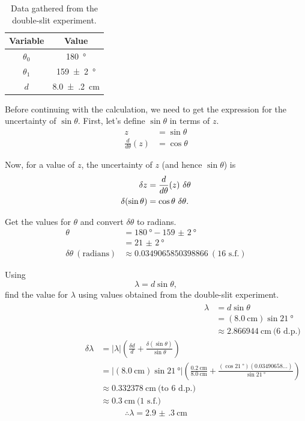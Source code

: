 \documentclass[letter,12pt]{article}
\newcommand{\tlambda}{\(\lambda\) }
\newcommand{\ttheta}{\(\theta\) }
\numberwithin{equation}{section}
\numberwithin{figure}{section}
\numberwithin{table}{section}
\begin{document}
\begin{table}[!ht]
  \centering
  \begin{tabular}{cS}
    \toprule
    {Variable} & {Value} \\ \midrule
    \(\theta_0\) & \SI{180}{\degree} \\
    \(\theta_1\) & \SI{159(2)}{\degree} \\
    \(d\) & \SI{8.0(2)}{\cm} \\
    \bottomrule
  \end{tabular}
  \caption{Data gathered from the double-slit experiment.}
  \label{table:e2}
\end{table}

Before continuing with the calculation, we need to get the expression for the uncertainty of \(\sin{} \theta\). First, let's define \(\sin \theta\) in terms of \(z\).
\begin{align*}
  z &= \sin \theta \\
  \frac{d}{d\theta}(z) &= \cos \theta 
\end{align*}

Now, for a value of \(z\), the uncertainty of \(z\) (and hence \(\sin \theta \)) is
\begin{align} \label{eq:e2}
  \delta z &= \frac{d}{d \theta}(z) \  \delta \theta \notag \\
  \delta (\sin \theta) &= \cos \theta \ \delta \theta.
\end{align}

Get the values for \ttheta and convert \(\delta\theta\) to radians.
\begin{align*}
  \theta &= \SI{180}{\degree} - \SI{159(2)}{\degree} \\
  &= \SI{21(2)}{\degree} \\
  \delta \theta \ (\mathrm{radians}) &\approx 0.0349065850398866 \ (\text{16 s.f.})
\end{align*}

Using \[\lambda = d \sin \theta,\] find the value for \tlambda using values obtained from the double-slit experiment.
\begin{align*}
  \begin{split}
    \lambda &= d \sin \theta \\
    &= (\SI{8.0}{\cm}) \sin{\SI{21}{\degree}} \\
    &\approx \SI{2.866944}{\cm} \ \text{(6 d.p.)}
  \end{split}
  \begin{split}
    \delta \lambda &= |\lambda| \left( \frac{\delta d}{d} + \frac{\delta (\sin\theta)}{\sin \theta} \right) \\
    &= |(\SI{8.0}{\cm}) \sin{\SI{21}{\degree}}| \left( \frac{\SI{0.2}{\cm}}{\SI{8.0}{\cm}} + \frac{(\cos{\SI{21}{\degree}})(0.03490658\dots)}{\sin{\SI{21}{\degree}}} \right) \\
    &\approx \SI{0.332378}{\cm} \ \text{(to 6 d.p.)} \\
    &\approx \SI{0.3}{\cm} \ \text{(1 s.f.)}
  \end{split}
\end{align*}
\[\therefore \lambda = \SI{2.9(3)}{\cm}\]
\end{document}
